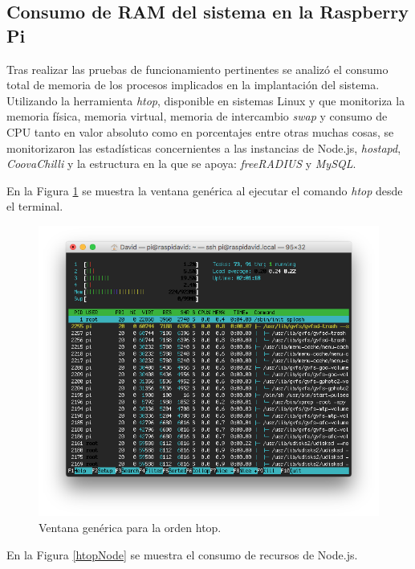 \subsection{Consumo de RAM del sistema en la Raspberry Pi}

Tras realizar las pruebas de funcionamiento pertinentes se analizó el consumo total de memoria de los procesos implicados en la implantación del sistema. Utilizando la herramienta \emph{htop}, disponible en sistemas Linux y que monitoriza la memoria física, memoria virtual, memoria de intercambio \emph{swap} y consumo de CPU tanto en valor absoluto como en porcentajes entre otras muchas cosas, se monitorizaron las estadísticas concernientes a las instancias de Node.js, \emph{hostapd}, \emph{CoovaChilli} y la estructura en la que se apoya: \emph{freeRADIUS} y \emph{MySQL}.

En la Figura \ref{htopGeneric} se muestra la ventana genérica al ejecutar el comando \emph{htop} desde el terminal.

\begin{figure}[!t]
\begin{center}
\includegraphics[width=0.75\linewidth]{./6_EvalEmpirica/Img/htopGeneric.png}
\end{center}
\caption{Ventana genérica para la orden htop.}
\label{htopGeneric}
\end{figure}

En la Figura \ref{htopNode} se muestra el consumo de recursos de Node.js.

